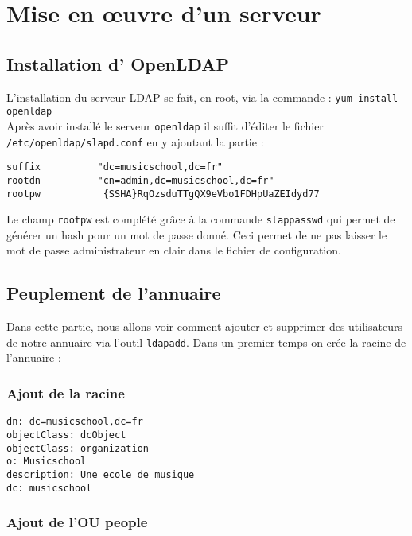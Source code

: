 \documentclass[12pt,a4paper,notitlepage]{article}
\begin{document}
\clearpage
\section{Mise en \oe uvre d'un serveur}
\subsection{Installation d' OpenLDAP}

L'installation du serveur LDAP se fait, en root, via la commande : \texttt{yum install openldap}\\

Après avoir installé le serveur \texttt{openldap} il suffit d'éditer le fichier \texttt{/etc/openldap/slapd.conf} en y ajoutant la partie : 

\begin{lstlisting}[title=Contenu du fichier slapd.conf]
suffix          "dc=musicschool,dc=fr"
rootdn          "cn=admin,dc=musicschool,dc=fr"
rootpw           {SSHA}RqOzsduTTgQX9eVbo1FDHpUaZEIdyd77

\end{lstlisting}

Le champ  \texttt{rootpw} est complété grâce à la commande \texttt{slappasswd} qui permet de générer un hash pour un mot de passe donné. Ceci permet de ne pas laisser le mot de passe administrateur en clair dans le fichier de configuration.\\


\subsection{Peuplement de l'annuaire}
Dans cette partie, nous allons voir comment ajouter et supprimer des utilisateurs de notre annuaire via l'outil \texttt{ldapadd}.
Dans un premier temps on crée la racine de l'annuaire :

\subsubsection{Ajout de la racine}

\begin{lstlisting}[title=racine.ldif]
dn: dc=musicschool,dc=fr
objectClass: dcObject
objectClass: organization
o: Musicschool
description: Une ecole de musique 
dc: musicschool 
\end{lstlisting}


\subsubsection{Ajout de l'OU people}
\end{document}
